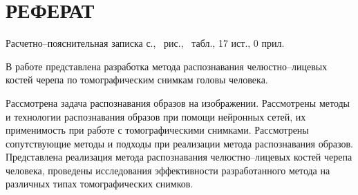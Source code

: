 \section*{РЕФЕРАТ}

Расчетно--пояснительная записка \pageref{LastPage} с., \totalfigures\ рис., \totaltables\ табл., 17 ист., 0 прил.

В работе представлена разработка метода распознавания челюстно--лицевых костей черепа по томографическим снимкам головы человека.

Рассмотрена задача распознавания образов на изображении. Рассмотрены методы и технологии распознавания образов при помощи нейронных сетей, их применимость при работе с томографическими снимками. Рассмотрены сопутствующие методы и подходы при реализации метода распознавания образов. Представлена реализация метода распознавания челюстно--лицевых костей черепа человека, проведены исследования эффективности разработанного метода на различных типах томографических снимков.